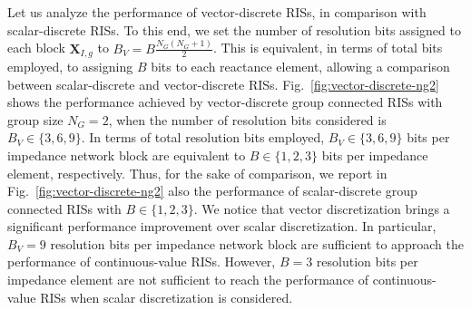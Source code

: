 \documentclass[twocolumn,10pt]{IEEEtran}
\begin{document}
Let us analyze the performance of vector-discrete RISs, in comparison with scalar-discrete RISs.
To this end, we set the number of resolution bits assigned to each block $\mathbf{X}_{I,g}$ to $B_V=B\frac{N_{G}\left(N_{G}+1\right)}{2}$.
This is equivalent, in terms of total bits employed, to assigning $B$ bits to each reactance element, allowing a comparison between scalar-discrete and vector-discrete RISs.
Fig.~\ref{fig:vector-discrete-ng2} shows the performance achieved by vector-discrete group connected RISs with group size $N_{G}=2$, when the number of resolution bits considered is $B_V\in\{3,6,9\}$.
In terms of total resolution bits employed, $B_V\in\{3,6,9\}$ bits per impedance network block are equivalent to $B\in\{1,2,3\}$ bits per impedance element, respectively.
Thus, for the sake of comparison, we report in Fig.~\ref{fig:vector-discrete-ng2} also the performance of scalar-discrete group connected RISs with $B\in\{1,2,3\}$.
We notice that vector discretization brings a significant performance improvement over scalar discretization.
In particular, $B_V=9$ resolution bits per impedance network block are sufficient to approach the performance of continuous-value RISs.
However, $B=3$ resolution bits per impedance element are not sufficient to reach the performance of continuous-value RISs when scalar discretization is considered.
\end{document}
